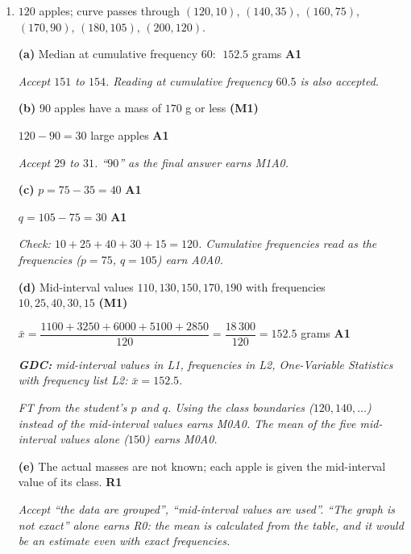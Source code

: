\documentclass[12pt, twoside]{article}
\begin{document}
\begin{enumerate}[itemsep=0.3cm]
\textbf{(e)} $Q_{1} - 1.5 \times \text{IQR} = 40 - 60 = -20$ \quad and \quad
$Q_{3} + 1.5 \times \text{IQR} = 80 + 60 = 140$ \hfill \textbf{M1}

$5 > -20$ and $118 < 140$, so neither the shortest nor the longest time is
an outlier \hfill \textbf{R1}

no outliers \hfill \textbf{AG}

\emph{M1 for at least one boundary correctly calculated (FT from (b)). The R1
needs both comparisons, with the minimum and the maximum. Checking only the
longest time earns M1R0.}

\newpage

\item[2.] [Maximum mark: 8]

$120$ apples; curve passes through $(120, 10)$, $(140, 35)$, $(160, 75)$,
$(170, 90)$, $(180, 105)$, $(200, 120)$.

\textbf{(a)} Median at cumulative frequency $60$: $\;152.5$ grams
\hfill \textbf{A1}

\emph{Accept $151$ to $154$. Reading at cumulative frequency $60.5$ is also
accepted.}

\textbf{(b)} $90$ apples have a mass of $170$ g or less \hfill
\textbf{(M1)}

$120 - 90 = 30$ large apples \hfill \textbf{A1}

\emph{Accept $29$ to $31$. ``$90$'' as the final answer earns M1A0.}

\textbf{(c)} $p = 75 - 35 = 40$ \hfill \textbf{A1}

$q = 105 - 75 = 30$ \hfill \textbf{A1}

\emph{Check: $10 + 25 + 40 + 30 + 15 = 120$. Cumulative frequencies read
as the frequencies ($p = 75$, $q = 105$) earn A0A0.}

\textbf{(d)} Mid-interval values $110, 130, 150, 170, 190$ with frequencies
$10, 25, 40, 30, 15$ \hfill \textbf{(M1)}

$\bar{x} = \dfrac{1100 + 3250 + 6000 + 5100 + 2850}{120} =
\dfrac{18\,300}{120} = 152.5$ grams \hfill \textbf{A1}

\emph{\textbf{GDC:} mid-interval values in L1, frequencies in L2, One-Variable
Statistics with frequency list L2: $\bar{x} = 152.5$.}

\emph{FT from the student's $p$ and $q$. Using the class boundaries ($120,
140, \ldots$) instead of the mid-interval values earns M0A0. The mean of the
five mid-interval values alone ($150$) earns M0A0.}

\textbf{(e)} The actual masses are not known; each apple is given the
mid-interval value of its class. \hfill \textbf{R1}

\emph{Accept ``the data are grouped'', ``mid-interval values are used''.
``The graph is not exact'' alone earns R0: the mean is calculated from the
table, and it would be an estimate even with exact frequencies.}

\end{enumerate}
\end{document}
